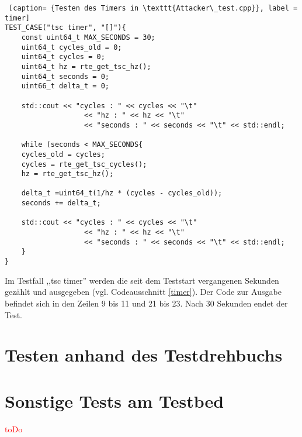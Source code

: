 \documentclass[../review_3.tex]{subfiles}
\begin{document}
\begin{lstlisting} [caption= {Testen des Timers in \texttt{Attacker\_test.cpp}}, label = timer]
TEST_CASE("tsc timer", "[]"){
    const uint64_t MAX_SECONDS = 30;
    uint64_t cycles_old = 0;
    uint64_t cycles = 0;
    uint64_t hz = rte_get_tsc_hz();
    uint64_t seconds = 0;
    uint66_t delta_t = 0;
    
    std::cout << "cycles : " << cycles << "\t"
                   << "hz : " << hz << "\t"
                   << "seconds : " << seconds << "\t" << std::endl;
    
    while (seconds < MAX_SECONDS{
    cycles_old = cycles;
    cycles = rte_get_tsc_cycles();
    hz = rte_get_tsc_hz();
    
    delta_t =uint64_t(1/hz * (cycles - cycles_old));
    seconds += delta_t;
    
    std::cout << "cycles : " << cycles << "\t"
                   << "hz : " << hz << "\t"
                   << "seconds : " << seconds << "\t" << std::endl;
    }
} \end{lstlisting}
Im Testfall ,,tsc timer'' werden die seit dem Teststart vergangenen Sekunden gezählt und ausgegeben (vgl. Codeausschnitt \ref{timer}). Der Code zur Ausgabe befindet sich in den Zeilen 9 bis 11 und 21 bis 23.
Nach 30 Sekunden endet der Test. %
\section{Testen anhand des Testdrehbuchs}

\section{Sonstige Tests am Testbed}

\textcolor{red}{toDo}
\end{document}
